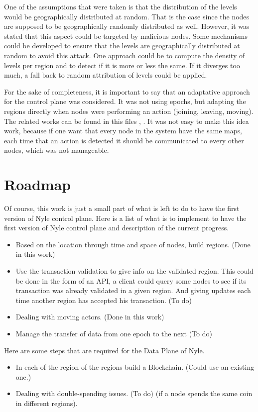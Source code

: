 \documentclass[a4paper,11pt,twoside=semi,openright]{report}
\begin{document}
One of the assumptions that were taken is that the distribution of the levels
would be geographically distributed at random. That is the case since the
nodes are supposed to be geographically randomly distributed as well.
However, it was stated that this aspect could be targeted by malicious nodes.
 Some mechanisms could be developed to ensure
that the levels are geographically distributed at random to avoid this attack. One approach could be
to compute the density of levels per region and to detect if it is more or less
the same. If it diverges too much, a fall back to random attribution of levels
could be applied. 

For the sake of completeness, it is important to say that an adaptative approach for the control plane was considered. It was not using epochs, but adapting the regions directly when nodes were performing an action (joining, leaving, moving). The related works can be found in this files \cite{ArnaudPannatier2019}, \cite{ArnaudPannatierWorks2019}. It was not easy to make this idea work, because if one want that every node in the system have the same maps, each time that an action is detected it should be communicated to every other nodes, which was not manageable. 

\section{Roadmap}
Of course, this work is just a small part of what is left to do to have the first
version of Nyle control plane. Here is a list of what is to implement to have the first version
of Nyle control plane and description of the current progress.

\begin{itemize} 
\item Based on the location through time and space of nodes, build regions.
(Done in this work)
\item Use the transaction validation to give info on the validated region. This could be done in the form of an API, a client could query some nodes to see if its transaction was already validated in a given region. And giving updates each time another region has accepted his transaction. (To
do) 
\item Dealing with moving actors. (Done in this work)
\item Manage the transfer of data from one epoch to the next (To do)
\end{itemize}

Here are some steps that are required for the Data Plane of Nyle. 
\begin{itemize} 
\item In each of the region of the regions build a Blockchain. (Could use an
 existing one.)
 \item Dealing with double-spending issues. (To do)
(if a node spends the same coin in different regions). 
\end{itemize}
\end{document}

